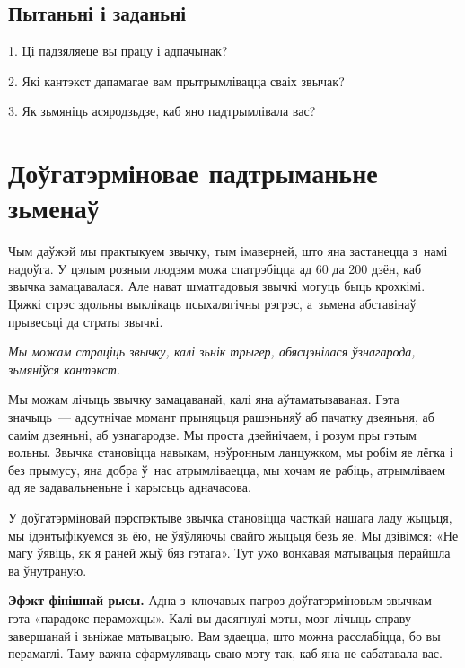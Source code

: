 \subsection*{Пытаньні і заданьні}

1. Ці падзяляеце вы працу і адпачынак?

2. Які кантэкст дапамагае вам прытрымлівацца сваіх звычак?

3. Як зьмяніць асяродзьдзе, каб яно падтрымлівала вас?


\section{Доўгатэрміновае падтрыманьне зьменаў}

Чым даўжэй мы практыкуем звычку, тым імаверней, што яна застанецца з~намі надоўга. У цэлым розным людзям можа спатрэбіцца ад 60 да 200 дзён, каб звычка замацавалася. Але нават шматгадовыя звычкі могуць быць крохкімі. Цяжкі стрэс здольны выклікаць псыхалягічны рэгрэс, а~зьмена абставінаў прывесьці да страты звычкі. 

\emph{Мы можам страціць звычку, калі зьнік трыгер, абясцэнілася ўзнагарода, зьмяніўся кантэкст.}

Мы можам лічыць звычку замацаванай, калі яна аўтаматызаваная. Гэта значыць~--- адсутнічае момант прыняцьця рашэньняў аб пачатку дзеяньня, аб самім дзеяньні, аб узнагародзе. Мы проста дзейнічаем, і розум пры гэтым вольны. Звычка становіцца навыкам, нэўронным ланцужком, мы робім яе лёгка і без прымусу, яна добра ў~нас атрымліваецца, мы хочам яе рабіць, атрымліваем ад яе задавальненьне і карысьць адначасова.


У доўгатэрміновай пэрспэктыве звычка становіцца часткай нашага ладу жыцьця, мы ідэнтыфікуемся зь ёю, не ўяўляючы свайго жыцьця безь яе. Мы дзівімся: «Не магу ўявіць, як я раней жыў бяз гэтага». Тут ужо вонкавая матывацыя перайшла ва ўнутраную.

\textbf{Эфэкт фінішнай рысы.} Адна з~ключавых пагроз доўгатэрміновым звычкам~--- гэта «парадокс пераможцы». Калі вы дасягнулі мэты, мозг лічыць справу завершанай і зьніжае матывацыю. Вам здаецца, што можна расслабіцца, бо вы перамаглі. Таму важна сфармуляваць сваю мэту так, каб яна не сабатавала вас.

